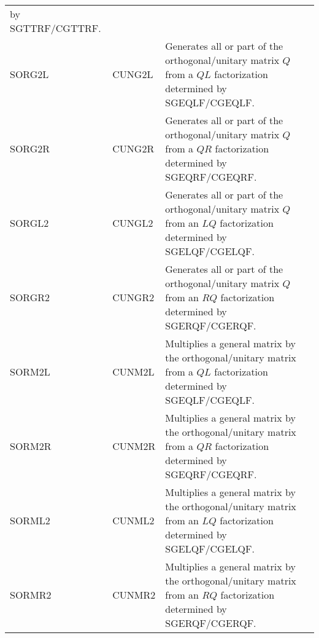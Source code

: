 \begin{center}
\begin{tabular}{| l   l | p{4.5in}    |}
by SGTTRF/CGTTRF. \\
SORG2L&CUNG2L&
Generates all or part of the orthogonal/unitary matrix $Q$ 
from a $QL$ factorization determined by SGEQLF/CGEQLF.\\
SORG2R&CUNG2R&
Generates all or part of the orthogonal/unitary matrix $Q$ 
from a $QR$ factorization determined by SGEQRF/CGEQRF.\\
SORGL2&CUNGL2&
Generates all or part of the orthogonal/unitary matrix $Q$ 
from an $LQ$ factorization determined by SGELQF/CGELQF.\\
SORGR2&CUNGR2&
Generates all or part of the orthogonal/unitary matrix $Q$ 
from an $RQ$ factorization determined by SGERQF/CGERQF.\\
SORM2L&CUNM2L&
Multiplies a general matrix by the orthogonal/unitary matrix 
from a $QL$ factorization determined by SGEQLF/CGEQLF.\\
SORM2R&CUNM2R&
Multiplies a general matrix by the orthogonal/unitary matrix 
from a $QR$ factorization determined by SGEQRF/CGEQRF.\\
SORML2&CUNML2&
Multiplies a general matrix by the orthogonal/unitary matrix 
from an $LQ$ factorization determined by SGELQF/CGELQF.\\
SORMR2&CUNMR2&
Multiplies a general matrix by the orthogonal/unitary matrix 
from an $RQ$ factorization determined by SGERQF/CGERQF.\\
\hline
\end{tabular}
\end{center}

